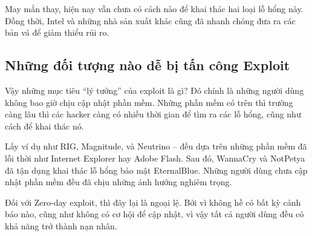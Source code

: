 \documentclass{article}
\begin{document}
May mắn thay, hiện nay vẫn chưa có cách nào để khai thác hai loại lỗ hổng này. Đồng thời, Intel và những nhà sản xuất khác cũng đã nhanh chóng đưa ra các bản vá để giảm thiểu rủi ro.

\subsection{Những đối tượng nào dễ bị tấn công Exploit}
Vậy những mục tiêu “lý tưởng” của exploit là gì? Đó chính là những người dùng không bao giờ chịu cập nhật phần mềm. Những phần mềm có trên thì trường càng lâu thì các hacker càng có nhiều thời gian để tìm ra các lỗ hổng, cũng như cách để khai thác nó.

Lấy ví dụ như RIG, Magnitude, và Neutrino – đều dựa trên những phần mềm đã lỗi thời như Internet Explorer hay Adobe Flash. Sau đó, WannaCry và NotPetya đã tận dụng khai thác lỗ hổng bảo mật EternalBlue. Những người dùng chưa cập nhật phần mềm đều đã chịu những ảnh hưởng nghiêm trọng.

Đối với Zero-day exploit, thì đây lại là ngoại lệ. Bởi vì không hề có bất kỳ cảnh báo nào, cũng như không có cơ hội để cập nhật, vì vậy tất cả người dùng đều có khả năng trở thành nạn nhân.
\end{document}
